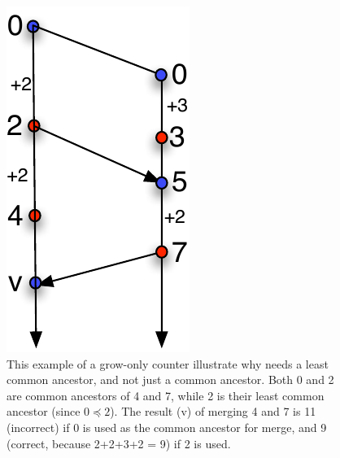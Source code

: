 \begin{figure}
\centering
\includegraphics[scale=0.6]{Figures/merge-needs-lca}

\caption{This example of a grow-only counter illustrate why 
needs a least common ancestor, and not just a common ancestor. Both 0
and 2 are common ancestors of 4 and 7, while 2 is their least common
ancestor (since $0 \preceq 2$). The result (v) of merging 4 and 7 is
11 (incorrect) if 0 is used as the common ancestor for merge, and 9
(correct, because 2+2+3+2 = 9) if 2 is used. }
\label{fig:merge-needs-lca}
\end{figure}

